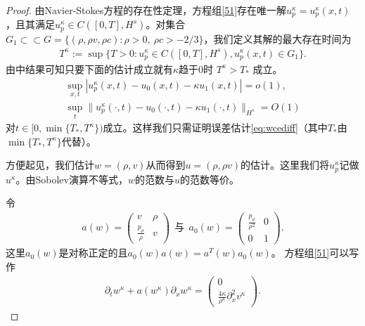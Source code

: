 \begin{proof}
由Navier-Stokes方程的存在性定理\cite{kawashima1984phd}，方程组\eqref{51}存在唯一解$u^\kappa_p=u^\kappa_p(x,t)$，且其满足$u^\kappa_p \in C([0,T],H^s)$。对集合$G_1\subset\subset G= \{(\rho, \rho v, \rho c): \rho>0,\ \rho c > -2/3\}$，我们定义其解的最大存在时间为
\begin{eqnarray*}
  T^\kappa :=\sup \{T>0 : u_p^\kappa  \in C([0,T],H^s), u^\kappa_p(x,t) \in G_1 \}.
\end{eqnarray*}
由\cite{yong2001basic}中结果可知只要下面的估计成立就有$\kappa$趋于$0$时
$T^\kappa > T_*$
成立。
\begin{eqnarray*}
\sup_{x,t} |u_p^\kappa(x,t) - u_0 (x, t) - \kappa u_1(x,t)|=o(1), \\
\sup_t \| u_p^\kappa(\cdot ,t) - u_0 (\cdot, t) - \kappa u_1(\cdot, t) \|_{H^s} = O(1)
\end{eqnarray*}
对$t \in [0,\min\{T_*,T^\kappa\})$成立。这样我们只需证明误差估计\eqref{eq:wcediff}（其中$T_*$由$\min\{T_*,T^\kappa\}$代替）。

方便起见，我们估计$w=(\rho,v)$从而得到$u=(\rho,\rho v)$的估计。这里我们将$u^\kappa_p$记做$u^\kappa$。由Sobolev演算不等式\cite{majda1984compressible}，$w$的范数与$u$的范数等价。

令
\begin{eqnarray*}
  a(w) = \left( \begin{array}{cc} v & \rho \\ \frac{p_\rho}{\rho} & v \end{array} \right) \ \ \mbox{与} \ \
  a_0(w) = \left( \begin{array}{cc} \frac{p_\rho}{\rho^2} & 0 \\ 0 & 1 \end{array} \right).
\end{eqnarray*}
这里$a_0(w)$是对称正定的且$a_0(w)a(w)=a^T(w)a_0(w)$。
方程组\eqref{51}可以写作
\begin{eqnarray}\label{57}
  \partial_t w^\kappa + a(w^\kappa) \partial_x w^\kappa = \left( \begin{array}{cc} 0 \\ \frac{4 \kappa}{\rho^\kappa} \partial^2_x v^\kappa \end{array} \right) .
\end{eqnarray}


\end{proof}
